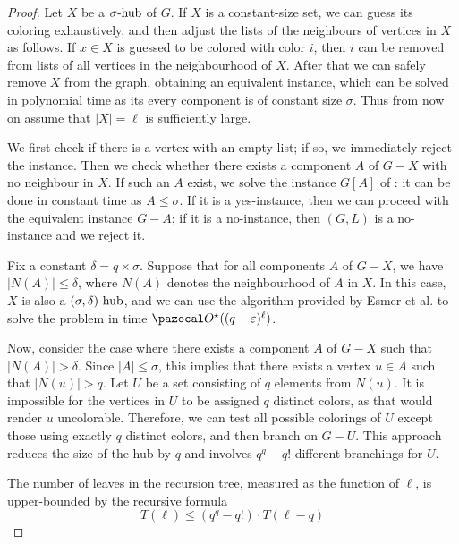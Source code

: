 \begin{proof}

    Let $X$ be a $\sigma\text{-hub}$ of $G$. If $X$ is a constant-size set, we can guess its coloring exhaustively, and then adjust the lists of the neighbours of vertices in $X$ as follows. If $x \in X$ is guessed to be colored with color $i$, then $i$ can be removed from lists of all vertices in the neighbourhood of $X$. After that we can safely remove $X$ from the graph, obtaining an equivalent instance, which can be solved in polynomial time as its every component is of constant size $\sigma$. Thus from now on assume that $|X| = \ell$ is sufficiently large.

    \medskip

    We first check if there is a vertex with an empty list; if so, we immediately reject the instance. Then we check whether there exists a component $A$ of $G - X$ with no neighbour in $X$. If such an $A$ exist, we solve the instance $G[A]$ of : it can be done in constant time as $A \leq \sigma$. If it is a yes-instance, then we can proceed with the equivalent instance $G - A$; if it is a no-instance, then $(G, L)$ is a no-instance and we reject it.

    \medskip


    Fix a constant $\delta = q \times \sigma$. Suppose that for all components $A$ of $G - X$, we have $|N(A)| \leq \delta$, where $N(A)$ denotes the neighbourhood of $A$ in $X$. In this case, $X$ is also a $(\sigma, \delta)\text{-hub}$, and we can use the algorithm provided by Esmer et al. \cite{esmer2024fundamental} to solve the problem in time $\O^\star((q - \varepsilon)^\ell)$.

    \medskip

    Now, consider the case where there exists a component $A$ of $G - X$ such that $|N(A)| > \delta$. Since $|A| \leq \sigma$, this implies that there exists a vertex $u \in A$ such that $|N(u)| > q$. Let $U$ be a set consisting of $q$ elements from $N(u)$. It is impossible for the vertices in $U$ to be assigned $q$ distinct colors, as that would render $u$ uncolorable. Therefore, we can test all possible colorings of $U$ except those using exactly $q$ distinct colors, and then branch on $G - U$. This approach reduces the size of the hub by $q$ and involves $q^q - q!$ different branchings for $U$.

    The number of leaves in the recursion tree, measured as the function of $\ell$, is upper-bounded by the recursive formula
    $$T(\ell) \leq (q^q - q!) \cdot T(\ell - q)$$

\end{proof}